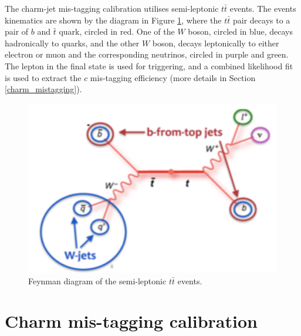 \documentclass[letterpaper,12pt]{article}
\begin{document}
The charm-jet mis-tagging calibration utilises semi-leptonic $t\bar{t}$ 
events. The events kinematics are shown by the diagram in 
Figure \ref{fig:feynman}, where the $t\bar{t}$ pair decays to a 
pair of $b$ and $\bar{t}$ quark, circled in red. One of the $W$ boson, 
circled in blue, decays hadronically to quarks, and the other $W$ boson, 
decays leptonically to either electron or muon and the corresponding neutrinos, 
circled in purple and green. The lepton in the final state is used for 
triggering, and a combined likelihood fit is used to extract the $c$ mis-tagging 
efficiency (more details in Section \ref{charm_mistagging}). 

\begin{figure}[H]
\centering
\begin{minipage}[b]{.45\textwidth}
\centering
\includegraphics[width=1\textwidth]{feynman.png}
\end{minipage}
\caption{Feynman diagram of the semi-leptonic $t\bar{t}$ events.}
\label{fig:feynman}
\end{figure}
\section{Charm mis-tagging calibration}
\label{charm mistagging}
\end{document}
